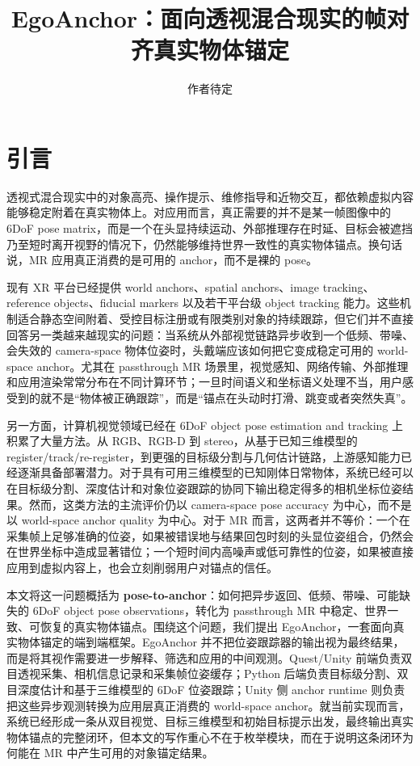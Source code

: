 \documentclass[review]{vgtc}
\title{EgoAnchor：面向透视混合现实的帧对齐真实物体锚定}
\author{作者待定}
\begin{document}
\maketitle

\section{引言}

透视式混合现实中的对象高亮、操作提示、维修指导和近物交互，都依赖虚拟内容能够稳定附着在真实物体上。对应用而言，真正需要的并不是某一帧图像中的 6DoF pose matrix，而是一个在头显持续运动、外部推理存在时延、目标会被遮挡乃至短时离开视野的情况下，仍然能够维持世界一致性的真实物体锚点。换句话说，MR 应用真正消费的是可用的 anchor，而不是裸的 pose。

现有 XR 平台已经提供 world anchors、spatial anchors、image tracking、reference objects、fiducial markers 以及若干平台级 object tracking 能力。这些机制适合静态空间附着、受控目标注册或有限类别对象的持续跟踪，但它们并不直接回答另一类越来越现实的问题：当系统从外部视觉链路异步收到一个低频、带噪、会失效的 camera-space 物体位姿时，头戴端应该如何把它变成稳定可用的 world-space anchor。尤其在 passthrough MR 场景里，视觉感知、网络传输、外部推理和应用渲染常常分布在不同计算环节；一旦时间语义和坐标语义处理不当，用户感受到的就不是“物体被正确跟踪”，而是“锚点在头动时打滑、跳变或者突然失真”。

另一方面，计算机视觉领域已经在 6DoF object pose estimation and tracking 上积累了大量方法。从 RGB、RGB-D 到 stereo，从基于已知三维模型的 register/track/re-register，到更强的目标级分割与几何估计链路，上游感知能力已经逐渐具备部署潜力。对于具有可用三维模型的已知刚体日常物体，系统已经可以在目标级分割、深度估计和对象位姿跟踪的协同下输出稳定得多的相机坐标位姿结果。然而，这类方法的主流评价仍以 camera-space pose accuracy 为中心，而不是以 world-space anchor quality 为中心。对于 MR 而言，这两者并不等价：一个在采集帧上足够准确的位姿，如果被错误地与结果回包时刻的头显位姿组合，仍然会在世界坐标中造成显著错位；一个短时间内高噪声或低可靠性的位姿，如果被直接应用到虚拟内容上，也会立刻削弱用户对锚点的信任。

本文将这一问题概括为 \textbf{pose-to-anchor}：如何把异步返回、低频、带噪、可能缺失的 6DoF object pose observations，转化为 passthrough MR 中稳定、世界一致、可恢复的真实物体锚点。围绕这个问题，我们提出 EgoAnchor，一套面向真实物体锚定的端到端框架。EgoAnchor 并不把位姿跟踪器的输出视为最终结果，而是将其视作需要进一步解释、筛选和应用的中间观测。Quest/Unity 前端负责双目透视采集、相机信息记录和采集帧位姿缓存；Python 后端负责目标级分割、双目深度估计和基于三维模型的 6DoF 位姿跟踪；Unity 侧 anchor runtime 则负责把这些异步观测转换为应用层真正消费的 world-space anchor。就当前实现而言，系统已经形成一条从双目视觉、目标三维模型和初始目标提示出发，最终输出真实物体锚点的完整闭环，但本文的写作重心不在于枚举模块，而在于说明这条闭环为何能在 MR 中产生可用的对象锚定结果。
\end{document}
